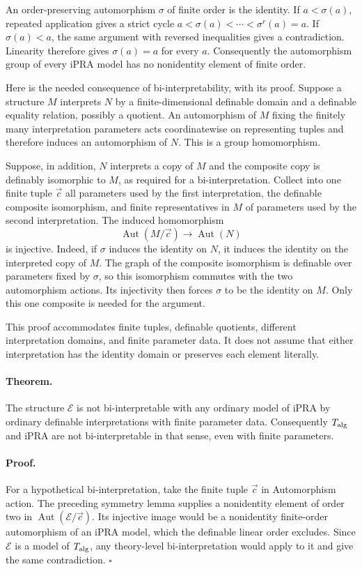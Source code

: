 \documentclass[11pt,letterpaper]{article}
\theoremstyle{definition}\newtheorem{definition}[theorem]{Definition}
\theoremstyle{remark}\newtheorem{remark}[theorem]{Remark}
\begin{document}
An order-preserving automorphism $\sigma$ of finite order is the
identity.  If $a<\sigma(a)$, repeated application gives a strict cycle
$a<\sigma(a)<\cdots<\sigma^r(a)=a$.  If $\sigma(a)<a$, the same
argument with reversed inequalities gives a contradiction.  Linearity
therefore gives $\sigma(a)=a$ for every $a$.  Consequently the
automorphism group of every iPRA model has no nonidentity element
of finite order.

Here is the needed consequence of bi-interpretability, with its proof.
Suppose a structure $M$ interprets $N$ by a finite-dimensional
definable domain and a definable equality relation, possibly a quotient.
An automorphism of $M$ fixing the finitely many interpretation
parameters acts coordinatewise on representing tuples and therefore
induces an automorphism of $N$.  This is a group homomorphism.

Suppose, in addition, $N$ interprets a copy of $M$ and the composite
copy is definably isomorphic to $M$, as required for a bi-interpretation.
Collect into one finite tuple $\vec c$ all parameters used by the
first interpretation, the definable composite isomorphism, and finite
representatives in $M$ of parameters used by the second interpretation.
The induced homomorphism
\[
 \operatorname{Aut}(M/\vec c)\longrightarrow\operatorname{Aut}(N)
 \tag{Automorphism action}
\]
is injective.  Indeed, if $\sigma$ induces the identity on $N$, it
induces the identity on the interpreted copy of $M$.  The graph of
the composite isomorphism is definable over parameters fixed by
$\sigma$, so this isomorphism commutes with the two automorphism
actions.  Its injectivity then forces $\sigma$ to be the identity on
$M$.  Only this one composite is needed for the argument.

This proof accommodates finite tuples, definable quotients, different
interpretation domains, and finite parameter data.  It does not assume
that either interpretation has the identity domain or preserves each
element literally.

\paragraph{Theorem.}
The structure $\mathcal E$ is not bi-interpretable with any ordinary
model of iPRA by ordinary definable interpretations with finite
parameter data.  Consequently $T_{\rm alg}$ and iPRA are not
bi-interpretable in that sense, even with finite parameters.

\paragraph{Proof.}
For a hypothetical bi-interpretation, take the finite tuple $\vec c$
in Automorphism action.  The preceding symmetry lemma supplies a
nonidentity element of order two in
$\operatorname{Aut}(\mathcal E/\vec c)$.  Its injective image would
be a nonidentity finite-order automorphism of an iPRA model, which
the definable linear order excludes.  Since $\mathcal E$ is a model
of $T_{\rm alg}$, any theory-level bi-interpretation would apply to it
and give the same contradiction.
\hfill$\square$
\end{document}
